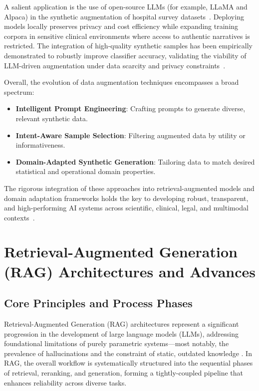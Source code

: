 \documentclass[sigconf]{acmart}
\begin{document}
A salient application is the use of open-source LLMs (for example, LLaMA and Alpaca) in the synthetic augmentation of hospital survey datasets~\cite{ref57}. Deploying models locally preserves privacy and cost efficiency while expanding training corpora in sensitive clinical environments where access to authentic narratives is restricted. The integration of high-quality synthetic samples has been empirically demonstrated to robustly improve classifier accuracy, validating the viability of LLM-driven augmentation under data scarcity and privacy constraints~\cite{ref57}.

Overall, the evolution of data augmentation techniques encompasses a broad spectrum:

\begin{itemize}
    \item \textbf{Intelligent Prompt Engineering}: Crafting prompts to generate diverse, relevant synthetic data.
    \item \textbf{Intent-Aware Sample Selection}: Filtering augmented data by utility or informativeness.
    \item \textbf{Domain-Adapted Synthetic Generation}: Tailoring data to match desired statistical and operational domain properties.
\end{itemize}

The rigorous integration of these approaches into retrieval-augmented models and domain adaptation frameworks holds the key to developing robust, transparent, and high-performing AI systems across scientific, clinical, legal, and multimodal contexts~\cite{ref5,ref10,ref12,ref15,ref16,ref22,ref24,ref31,ref32,ref36,ref37,ref43,ref48,ref49,ref52,ref54,ref55,ref61,ref62,ref57}.

\section{Retrieval-Augmented Generation (RAG) Architectures and Advances}

\subsection{Core Principles and Process Phases}

Retrieval-Augmented Generation (RAG) architectures represent a significant progression in the development of large language models (LLMs), addressing foundational limitations of purely parametric systems—most notably, the prevalence of hallucinations and the constraint of static, outdated knowledge \cite{ref4, ref5, ref8, ref10, ref14, ref15, ref16, ref17, ref35, ref36, ref37, ref42, ref52, ref54, ref55, ref64}. In RAG, the overall workflow is systematically structured into the sequential phases of retrieval, reranking, and generation, forming a tightly-coupled pipeline that enhances reliability across diverse tasks.
\end{document}
